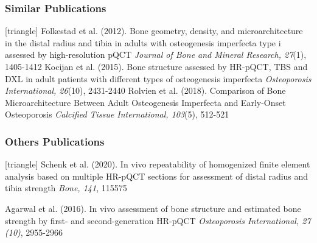 \documentclass[xcolor=table]{beamer}
\begin{document}
\begin{frame}
	\frametitle{Similar Publications}
	\footnotesize{
		\begin{thebibliography}{99}
			[triangle]
			 Folkestad et al. (2012).
			\newblock Bone geometry, density, and microarchitecture in the distal radius and tibia in adults with osteogenesis imperfecta type i assessed by high-resolution pQCT
			\newblock \textit{Journal of Bone and Mineral Research, 27}(1), 1405-1412
			\vspace{1mm}
			 Kocijan et al. (2015).
			\newblock Bone structure assessed by HR-pQCT, TBS and DXL in adult patients with different types of osteogenesis imperfecta
			\newblock \textit{Osteoporosis International, 26}(10), 2431-2440
			\vspace{1mm}
			 Rolvien et al. (2018).
			\newblock Comparison of Bone Microarchitecture Between Adult Osteogenesis Imperfecta and Early-Onset Osteoporosis
			\newblock \textit{Calcified Tissue International, 103}(5), 512-521
		\end{thebibliography}
	}
\end{frame}


\begin{frame}
	\frametitle{Others Publications}
	\footnotesize{
		\begin{thebibliography}{99}
			[triangle]
			 Schenk et al. (2020).
			\newblock In vivo repeatability of homogenized finite element analysis based on multiple HR-pQCT sections for assessment of distal radius and tibia strength
			\newblock \textit{Bone, 141}, 115575
			
			\vspace{1mm}
			
			 Agarwal et al. (2016).
			\newblock In vivo assessment of bone structure and estimated bone strength by first- and second-generation HR-pQCT
			\newblock \textit{Osteoporosis International, 27 (10)}, 2955-2966
			
		\end{thebibliography}
	}
\end{frame}


\end{document}
